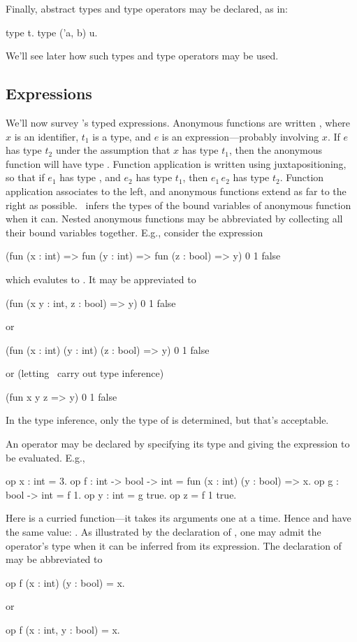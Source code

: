 Finally, abstract types and type operators may be declared, as in:
\begin{easycrypt}{}{}
type t.
type ('a, b) u.
\end{easycrypt}
We'll see later how such types and type operators may be used.

\subsection{Expressions}

We'll now survey \EasyCrypt's typed expressions. Anonymous functions
are written , where $x$ is an identifier,
$t_1$ is a type, and $e$ is an expression---probably involving $x$.
If $e$ has type $t_2$ under the assumption that $x$ has type $t_1$,
then the anonymous function will have type .
Function application is written using juxtapositioning, so that if
$e_1$ has type , and $e_2$ has type $t_1$, then
$e_1\,e_2$ has type $t_2$. Function application associates to the
left, and anonymous functions extend as far to the right as possible.
\EasyCrypt\ infers the types of the bound variables of anonymous function
when it can. Nested anonymous functions may be abbreviated by
collecting all their bound variables together. E.g., consider the
expression
\begin{easycrypt}{}{}
(fun (x : int) => fun (y : int) => fun (z : bool) => y) 0 1 false
\end{easycrypt}
which evalutes to . It may be appreviated to
\begin{easycrypt}{}{}
(fun (x y : int, z : bool) => y) 0 1 false
\end{easycrypt}
or
\begin{easycrypt}{}{}
(fun (x : int) (y : int) (z : bool) => y) 0 1 false
\end{easycrypt}
or (letting \EasyCrypt\ carry out type inference)
\begin{easycrypt}{}{}
(fun x y z => y) 0 1 false
\end{easycrypt}
In the type inference, only the type of  is determined, but
that's acceptable.

An operator may be declared by specifying its type and giving the
expression to be evaluated. E.g.,
\begin{easycrypt}{}{}
op x : int = 3.
op f : int -> bool -> int = fun (x : int) (y : bool) => x.
op g : bool -> int = f 1.
op y : int = g true.
op z = f 1 true.
\end{easycrypt}
Here  is a curried function---it takes its arguments one
at a time. Hence  and  have the same value: .
As illustrated by the declaration of , one may admit the
operator's type when it can be inferred from its expression.
The declaration of  may be abbreviated to
\begin{easycrypt}{}{}
op f (x : int) (y : bool) = x.
\end{easycrypt}
or
\begin{easycrypt}{}{}
op f (x : int, y : bool) = x.
\end{easycrypt}

